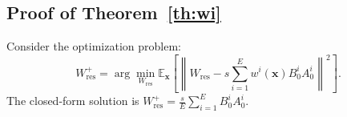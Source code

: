 \subsection{Proof of Theorem~\ref{th:wi}}
\begin{tcolorbox}[colback=gray!20,colframe=gray]
\begin{Theorem2}[3.4]
Consider the optimization problem:
\begin{equation}
    W_{\text{res}}^+ = \arg\min_{W_{\text{res}}} \mathbb{E}_{\mathbf{x}} \left[ \left\| W_{\text{res}} - s \sum_{i=1}^E w^i(\mathbf{x}) B^i_0 A^i_0 \right\|^2 \right].
\end{equation}
The closed-form solution is \( W_{\text{res}}^+ = \frac{s}{E} \sum_{i=1}^E B^i_0 A^i_0 \).
\end{Theorem2}
\end{tcolorbox}

